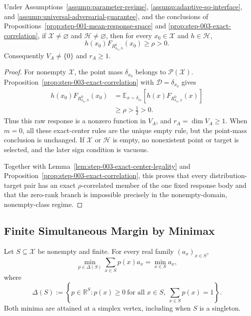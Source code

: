 \begin{proposition}
\label{prop:step-003-nonzero-rank}
Under Assumptions~\ref{assump:parameter-regime},
\ref{assump:adaptive-sq-interface}, and
\ref{assump:universal-adversarial-guarantee}, and the conclusions of
Propositions~\ref{prop:step-001-mean-response-space} and
\ref{prop:step-003-exact-correlation}, if
\(\mathcal X\ne\varnothing\) and \(\mathcal H\ne\varnothing\), then for
every \(x_0\in\mathcal X\) and \(h\in\mathcal H\),
\[
h(x_0)F_{R^0_{\delta_{x_0},h}}(x_0)\ge\rho>0.
\]
Consequently \(V_A\ne\{0\}\) and \(r_A\ge1\).
\end{proposition}

\begin{proof}
For nonempty \(\mathcal X\), the point mass \(\delta_{x_0}\) belongs to
\(\mathcal P(\mathcal X)\).  Proposition~\ref{prop:step-003-exact-correlation}
with \(\mathcal D=\delta_{x_0}\) gives
\[
\begin{aligned}
h(x_0)F_{R^0_{\delta_{x_0},h}}(x_0)
&=\mathbb E_{x\sim\delta_{x_0}}
[h(x)F_{R^0_{\delta_{x_0},h}}(x)]\\
&\ge\rho>\frac12>0.
\end{aligned}
\]
Thus this raw response is a nonzero function in \(V_A\), and
\(r_A=\dim V_A\ge1\).  When \(m=0\), all these exact-center rules are the
unique empty rule, but the point-mass conclusion is unchanged.  If
\(\mathcal X\) or \(\mathcal H\) is empty, no nonexistent point or target is
selected, and the later sign condition is vacuous.

Together with Lemma~\ref{lem:step-003-exact-center-legality} and
Proposition~\ref{prop:step-003-exact-correlation}, this proves that every
distribution-target pair has an exact \(\rho\)-correlated member of the one
fixed response body and that the zero-rank branch is impossible precisely in
the nonempty-domain, nonempty-class regime.
\end{proof}

\subsection{Finite Simultaneous Margin by Minimax}
\label{app:step-004}

\begin{lemma}
\label{lem:step-004-simplex-vertex}
Let \(S\subseteq\mathcal X\) be nonempty and finite.  For every real family
\((a_x)_{x\in S}\),
\[
\min_{p\in\Delta(S)}\sum_{x\in S}p(x)a_x
=\min_{x\in S}a_x,
\]
where
\[
\Delta(S):=\left\{p\in\mathbb R^S:p(x)\ge0\ \text{for all }x\in S,
\ \sum_{x\in S}p(x)=1\right\}.
\]
Both minima are attained at a simplex vertex, including when \(S\) is a
singleton.
\end{lemma}

